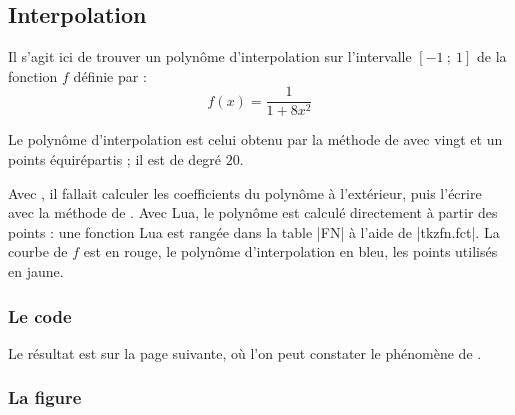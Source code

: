 \subsection{Interpolation}

Il s'agit ici de trouver un polynôme d'interpolation sur l'intervalle $[-1~;~1]$ de la fonction $f$ définie par :
\[
  f(x)=\frac{1}{1+8x^2}
\]

Le polynôme d'interpolation est celui obtenu par la méthode de  avec vingt et un points équirépartis ; il est de degré $20$.

Avec , il fallait calculer les coefficients du polynôme à l'extérieur, puis l'écrire avec la méthode de . Avec Lua, le polynôme est calculé directement à partir des points : une fonction Lua est rangée dans la table |FN| à l'aide de |tkzfn.fct|. La courbe de $f$ est en rouge, le polynôme d'interpolation en bleu, les points utilisés en jaune.

\subsubsection{Le code}
\begin{tkzexample}
\end{tkzexample}

Le résultat est sur la page suivante, où l'on peut constater le phénomène de .

\subsubsection{La figure}

